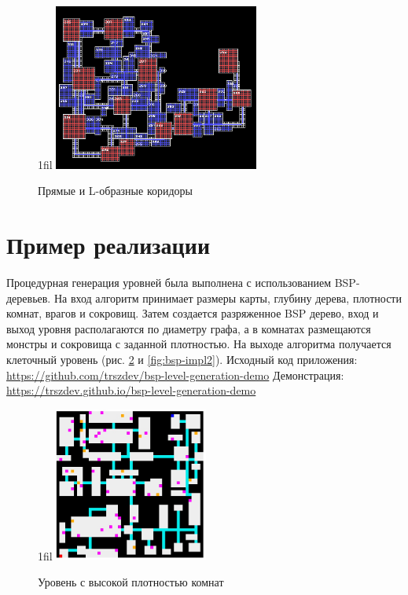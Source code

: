 \documentclass[a4paper,12pt]{report}
\makeatletter
\newcommand*{\centerfloat}{%
  \parindent \z@
  \leftskip \z@ \@plus 1fil \@minus \textwidth
  \rightskip\leftskip
  \parfillskip \z@skip}
\makeatother
\begin{document}
\begin{figure}
    \centerfloat
    \includegraphics[width=0.6\textwidth]{levels/room.png}
    \caption{Прямые и L-образные коридоры \citep{room}}
    \label{fig:room}
\end{figure}

\section{Пример реализации}

Процедурная генерация уровней была выполнена с использованием BSP-деревьев. На вход алгоритм принимает размеры карты, глубину дерева, плотности комнат, врагов и сокровищ. Затем создается разряженное BSP дерево, вход и выход уровня располагаются по диаметру графа, а в комнатах размещаются монстры и сокровища с заданной плотностью. На выходе алгоритма получается клеточный уровень (рис. \ref{fig:bsp-impl} и \ref{fig:bsp-impl2}).
\newline
\newline
Исходный код приложения: \url{https://github.com/trszdev/bsp-level-generation-demo}
\newline
Демонстрация: \url{https://trszdev.github.io/bsp-level-generation-demo}

\begin{figure}
    \centerfloat
    \includegraphics[width=0.45\textwidth]{levels/5.jpg}
    \caption{Уровень с высокой плотностью комнат}
    \label{fig:bsp-impl}
\end{figure}
\end{document}
